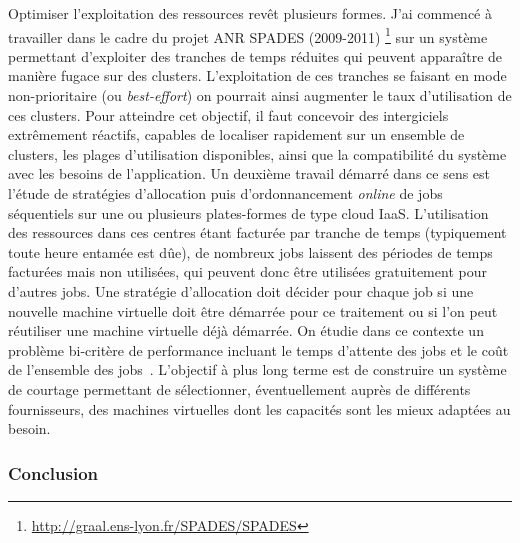 \documentclass[11pt]{article}
\begin{document}
Optimiser l'exploitation des ressources revêt plusieurs formes. J'ai commencé à
travailler dans le cadre du projet ANR SPADES (2009-2011)%
\footnote{\url{http://graal.ens-lyon.fr/SPADES/SPADES}}    sur     un    système
permettant d'exploiter des tranches de  temps réduites qui peuvent apparaître de
manière fugace  sur des clusters. L'exploitation  de ces tranches se  faisant en
mode non-prioritaire  (ou \textit{best-effort})  on pourrait ainsi  augmenter le
taux  d'utilisation de  ces  clusters.   Pour atteindre  cet  objectif, il  faut
concevoir  des   intergiciels  extrêmement   réactifs,  capables   de  localiser
rapidement sur  un ensemble de  clusters, les plages  d'utilisation disponibles,
ainsi que  la compatibilité  du système  avec les  besoins de  l'application. Un
deuxième travail  démarré dans  ce sens est  l'étude de  stratégies d'allocation
puis d'ordonnancement \textit{online}  de jobs séquentiels sur  une ou plusieurs
plates-formes de type cloud IaaS.  L'utilisation des ressources dans ces centres
étant facturée par  tranche de temps (typiquement toute heure  entamée est dûe),
de nombreux  jobs laissent des périodes  de temps facturées mais  non utilisées,
qui peuvent donc  être utilisées gratuitement pour d'autres  jobs. Une stratégie
d'allocation doit décider pour chaque job si une nouvelle machine virtuelle doit
être  démarrée  pour ce  traitement  ou  si  l'on  peut réutiliser  une  machine
virtuelle déjà  démarrée. On étudie dans  ce contexte un problème  bi-critère de
performance incluant  le temps d'attente des  jobs et le coût  de l'ensemble des
jobs~\cite{icps-2011-225}.  L'objectif  à plus long  terme est de  construire un
système  de  courtage  permettant  de  sélectionner,  éventuellement  auprès  de
différents fournisseurs,  des machines  virtuelles dont  les capacités  sont les
mieux adaptées au besoin.


\subsubsection{Conclusion}
\end{document}
